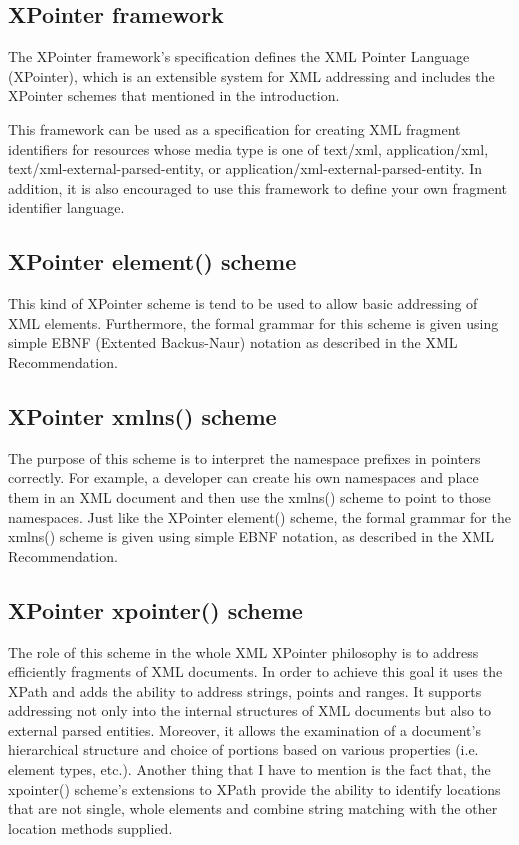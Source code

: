 \documentclass[11pt]{article}
\begin{document}
\subsection{XPointer framework}

The XPointer framework's specification defines the XML Pointer Language (XPointer), which is an extensible system for XML addressing and includes the XPointer schemes that mentioned in the introduction.

This framework can be used as a specification for creating XML fragment identifiers for resources whose media type is one of text/xml, application/xml, text/xml-external-parsed-entity, or application/xml-external-parsed-entity. In addition, it is also encouraged to use this framework to define your own fragment identifier language. \cite{xpointerframework}

\subsection{XPointer element() scheme}

This kind of XPointer scheme is tend to be used to allow basic addressing of XML elements. Furthermore, the formal grammar for this scheme is given using simple EBNF (Extented Backus-Naur) notation as described in the XML Recommendation.\cite{elementscheme}

\subsection{XPointer xmlns() scheme}

The purpose of this scheme is to interpret the namespace prefixes in pointers correctly. For example, a developer can create his own namespaces and place them in an XML document and then use the xmlns() scheme to point to those namespaces. Just like the XPointer element() scheme, the formal grammar for the xmlns() scheme is given using simple EBNF notation, as described in the XML Recommendation.\cite{xmlnsscheme} 

\subsection{XPointer xpointer() scheme}

The role of this scheme in the whole XML XPointer philosophy is to address efficiently fragments of XML documents. In order to achieve this goal it uses the XPath and adds the ability to address strings, points and ranges. It supports addressing not only into the internal structures of XML documents but also to external parsed entities. Moreover, it allows the examination of a document's hierarchical structure and choice of portions based on various properties (i.e. element types, etc.). Another thing that I have to mention is the fact that, the xpointer() scheme's extensions to XPath provide the ability to identify locations that are not single, whole elements and combine string matching with the other location methods supplied.\cite{xpointerscheme}
\end{document}
